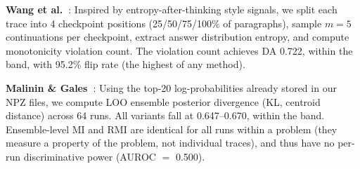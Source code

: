 \documentclass{article}
\begin{document}
\begin{table}[t]
\centering
\caption{Reproduced prior methods under SEP (Qwen Hard, $n{=}62$).}
\label{tab:repro}
\end{table}

\textbf{Wang et al.~\cite{wang2025eat}}: Inspired by entropy-after-thinking style signals, we split each trace into 4 checkpoint positions (25/50/75/100\% of paragraphs), sample $m{=}5$ continuations per checkpoint, extract answer distribution entropy, and compute monotonicity violation count. The violation count achieves DA 0.722, within the band, with 95.2\% flip rate (the highest of any method).

\textbf{Malinin \& Gales~\cite{malinin2021uncertainty}}: Using the top-20 log-probabilities already stored in our NPZ files, we compute LOO ensemble posterior divergence (KL, centroid distance) across 64 runs. All variants fall at 0.647--0.670, within the band. Ensemble-level MI and RMI are identical for all runs within a problem (they measure a property of the problem, not individual traces), and thus have no per-run discriminative power (AUROC $=$ 0.500).
\end{document}
